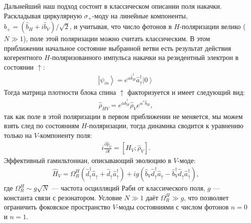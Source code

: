 \documentclass[11pt]{article}    %
\numberwithin{equation}{section}
\begin{document}
Дальнейший наш подход состоит в классическом описании поля
накачки. Раскладывая циркулярную $\sigma_+$-моду на линейные
компоненты, $\hat{b}_{+} = (\hat{b}_{H} + i\hat{b}_{V})/\sqrt{2}$,
и учитывая, что число фотонов в $H$-поляризации велико ($N \gg 1$),
поле этой поляризации можно считать классическим. В этом приближении
начальное состояние выбранной ветви есть результат действия
когерентного $H$-поляризованного импульса накачки на резидентный
электрон в состоянии $\uparrow$:
\begin{gather}
    \left| \psi_{in} \right\rangle = e^{\alpha \hat{b}^{\dag}_{H}}
    \hat{a}^{\dag}_{\uparrow} \left| 0 \right\rangle
\end{gather}
Тогда матрица плотности блока спина $\uparrow$ факторизуется и имеет следующий вид:
\begin{gather}
    \hat{\rho}_{HV} = e^{\alpha \hat{b}^{\dag}_{H}}  \hat{\rho}_{V}  e^{\alpha^{*} \hat{b}_{H}},
\end{gather}
так как поле в этой поляризации в первом приближении не меняется,
мы можем взять след по состояниям $H$-поляризации,
тогда динамика сводится к уравнению только на $V$-компоненту поля:
\begin{gather}
    i \frac{\partial \hat{\rho}_{V} }{\partial t} = \left[ \hat{H}_{V} ; \hat{\rho}_{V} \right].
\end{gather}
Эффективный гамильтониан, описывающий эволюцию в $V$-моде:
\begin{gather}
    \hat{H}_V = \Omega_R^{H} \left( \hat{d}^{\dag}_{\uparrow} \hat{a}_{\uparrow}
    + \hat{d}_{\uparrow} \hat{a}^{\dag}_{\uparrow} \right)
    + ig \left( \hat{b}_{V} \hat{d}^{\dag}_{\uparrow} \hat{a}_{\uparrow}
    - \hat{b}^{\dag}_{V} \hat{d}_{\uparrow} \hat{a}^{\dag}_{\uparrow} \right),
\end{gather}
где $\Omega_R^{H} \sim g\sqrt{N}$ --- частота осцилляций Раби от классического поля,
$g$ --- константа связи с резонатором.
Условие $N \gg 1$ даёт $\Omega_R^{H} \gg g$,
что позволяет ограничить фоковское пространство $V$-моды состояниями
с числом фотонов $n = 0$ и $n = 1$.
\end{document}
